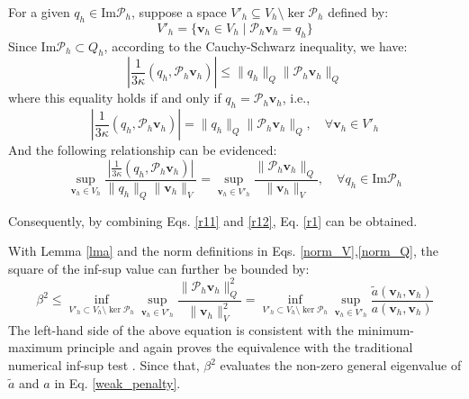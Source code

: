 \begin{pf}
For a given $q_h \in \mathrm{Im} \mathcal{P}_h$, suppose a space $V'_h \subseteq V_h \setminus \ker \mathcal{P}_h$ defined by:
\begin{equation}
V'_h = \{\boldsymbol{v}_h \in V_h \mid \mathcal{P}_h \boldsymbol{v}_h = q_h\}
\end{equation}
Since $\mathrm{Im} \mathcal{P}_h \subset Q_h$, according to the Cauchy-Schwarz inequality, we have:
\begin{equation}
\left| \frac{1}{3\kappa} (q_h, \mathcal{P}_h \boldsymbol{v}_h) \right| \le \|q_h\|_Q \|\mathcal{P}_h \boldsymbol{v}_h\|_Q
\end{equation}
where this equality holds if and only if $q_h = \mathcal{P}_h \boldsymbol{v}_h$, i.e.,
\begin{equation}
\left| \frac{1}{3\kappa} (q_h, \mathcal{P}_h \boldsymbol{v}_h) \right| = \|q_h\|_Q \|\mathcal{P}_h \boldsymbol{v}_h\|_Q, \quad \forall \boldsymbol{v}_h \in V'_h
\end{equation}
And the following relationship can be evidenced:
\begin{equation}\label{r12}
\sup_{\boldsymbol{v}_h \in V_h} \frac{\left| \frac{1}{3\kappa} (q_h, \mathcal{P}_h \boldsymbol{v}_h) \right|}{\|q_h\|_Q \|\boldsymbol{v}_h\|_V} = \sup_{\boldsymbol{v}_h \in V'_h} \frac{\|\mathcal{P}_h \boldsymbol{v}_h\|_Q}{\|\boldsymbol{v}_h\|_V}, \quad \forall q_h \in \mathrm{Im} \mathcal{P}_h
\end{equation}

Consequently, by combining Eqs. \eqref{r11} and \eqref{r12}, Eq. \eqref{r1} can be obtained.
\end{pf}

\begin{rmk}
With Lemma \ref{lma} and the norm definitions in Eqs. \eqref{norm_V},\eqref{norm_Q}, the square of the inf-sup value can further be bounded by:
\begin{equation}
\label{infsup_test}
\beta^2 \le \inf_{V'_h \subset V_h \setminus \ker \mathcal{P}_h} \sup_{\boldsymbol{v}_h \in V'_h} \frac{\|\mathcal{P}_h \boldsymbol{v}_h\|_Q^2}{\|\boldsymbol{v}_h\|_V^2} = \inf_{V'_h \subset V_h \setminus \ker \mathcal{P}_h} \sup_{\boldsymbol{v}_h \in V'_h} \frac{\tilde{a}(\boldsymbol{v}_h, \boldsymbol{v}_h)}{a(\boldsymbol{v}_h, \boldsymbol{v}_h)}
\end{equation}
The left-hand side of the above equation is consistent with the minimum-maximum principle \cite{babuska1991} and again proves the equivalence with the traditional numerical inf-sup test \cite{malkus1981}. Since that, $\beta^2$ evaluates the non-zero general eigenvalue of $\tilde{a}$ and $a$ in Eq. \eqref{weak_penalty}.
\end{rmk}

